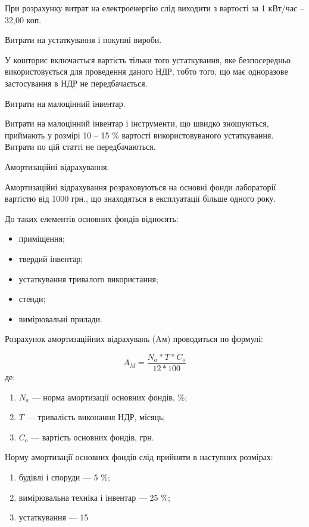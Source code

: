 При розрахунку витрат на електроенергію слід виходити з вартості за 1 кВт/час – 32,00 коп.

Витрати на устаткування і покупні вироби. 

У кошторис включається вартість тільки того устаткування, яке безпосередньо використовується для проведення даного НДР, тобто того, що має одноразове застосування в НДР не передбачається.

Витрати на малоцінний інвентар. 

Витрати на малоцінний інвентар і інструменти, що швидко зношуються, приймають у розмірі 10 – 15 \% вартості використовуваного устаткування. Витрати по цій статті не передбачаються.

Амортизаційні відрахування.

Амортизаційні відрахування розраховуються на основні фонди лабораторії вартістю від 1000 грн., що знаходяться в експлуатації більше одного року.

До таких елементів основних фондів відносять:
\begin{itemize}
\item приміщення;
\item твердий інвентар;
\item устаткування тривалого використання;
\item стенди;
\item вимірювальні прилади.
\end{itemize}

Розрахунок амортизаційних відрахувань (Aм) проводиться по формулі:

\begin{equation}
A_M = \frac{N_a * T * C_o}{12*100}
\end{equation}
де:
\begin{enumerate}
\item $N_a$ --- норма амортизації основних фондів, \%;
\item $T$ --- тривалість виконання НДР, місяць;
\item $C_o$ --- вартість основних фондів, грн.
\end{enumerate}

Норму амортизації основних фондів слід прийняти в наступних розмірах:

\begin{enumerate}
\item будівлі і споруди --- 5 \%;
\item вимірювальна техніка і інвентар --- 25 \%;
\item устаткування --- 15 %
\end{enumerate}

